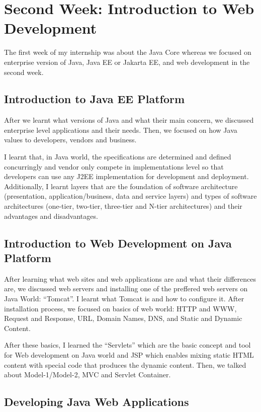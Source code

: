 \section{Second Week: Introduction to Web Development}

The first week of my internship was about the Java Core whereas we focused on enterprise version of Java, Java EE or Jakarta EE, and web development in the second week.

\subsection{Introduction to Java EE Platform}

After we learnt what versions of Java and what their main concern, we discussed enterprise level applications and their needs. Then, we focused on how Java values to developers, vendors and business.

I learnt that, in Java world, the specifications are determined and defined concurringly and vendor only compete in implementations level so that developers can use any J2EE implementation for development and deployment. Additionally, I learnt layers that are the foundation of software architecture (presentation, application/business, data and service layers) and types of software architectures (one-tier, two-tier, three-tier and N-tier architectures) and their advantages and disadvantages.

\subsection{Introduction to Web Development on Java Platform}

After learning what web sites and web applications are and what their differences are, we discussed web servers and installing one of the preffered web servers on Java World: ``Tomcat''. I learnt what Tomcat is and how to configure it. After installation process, we focused on basics of web world: HTTP and WWW, Request and Response, URL, Domain Names, DNS, and Static and Dynamic Content.

After these basics, I learned the ``Servlets'' which are the basic concept and tool for Web development on Java world and JSP which enables mixing static HTML content with special code that produces the dynamic content. Then, we talked about Model-1/Model-2, MVC and Servlet Container.

\subsection{Developing Java Web Applications}

